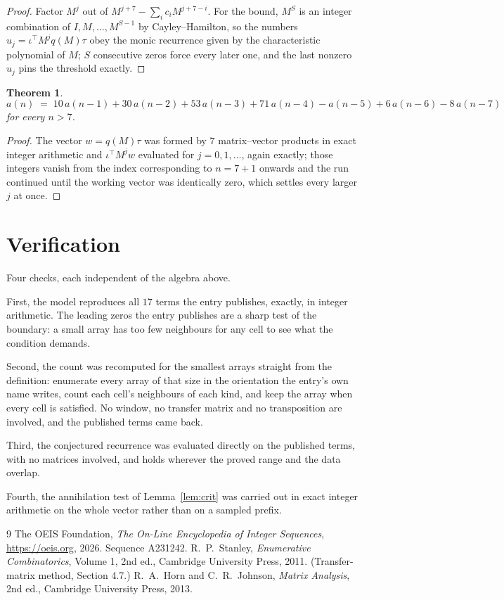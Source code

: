 \documentclass[11pt,a4paper]{article}
\theoremstyle{plain}
\newtheorem{theorem}{Theorem}
\theoremstyle{definition}
\begin{document}
\begin{proof}
Factor $M^{j}$ out of $M^{j+7}-\sum_ic_iM^{j+7-i}$. For the bound, $M^{S}$
is an integer combination of $I,M,\dots,M^{S-1}$ by Cayley--Hamilton, so the numbers
$u_j=\iota^{\!\top}M^{j}q(M)\tau$ obey the monic recurrence given by the characteristic
polynomial of $M$; $S$ consecutive zeros force every later one, and the last nonzero $u_j$
pins the threshold exactly.
\end{proof}

\begin{theorem}
\[
a(n)\;=\;10\,a(n-1) + 30\,a(n-2) + 53\,a(n-3) + 71\,a(n-4) - a(n-5) + 6\,a(n-6) - 8\,a(n-7)
\]
for every $n>7$.
\end{theorem}

\begin{proof}
The vector $w=q(M)\tau$ was formed by $7$ matrix--vector products in exact integer
arithmetic and $\iota^{\!\top}M^{j}w$ evaluated for $j=0,1,\dots$, again exactly; those
integers vanish from the index corresponding to $n=7+1$ onwards and the run continued
until the working vector was identically zero, which settles every larger $j$ at once.
\end{proof}

\section{Verification}

Four checks, each independent of the algebra above.

First, the model reproduces all $17$ terms the entry publishes, exactly, in integer
arithmetic. The leading zeros the entry publishes are a sharp test of the boundary: a small
array has too few neighbours for any cell to see what the condition demands.

Second, the count was recomputed for the smallest arrays straight from the definition:
enumerate every array of that size in the orientation the entry's own name writes, count each
cell's neighbours of each kind, and keep the array when every cell is satisfied. No window, no
transfer matrix and no transposition are involved, and the published terms came back.

Third, the conjectured recurrence was evaluated directly on the published terms, with no
matrices involved, and holds wherever the proved range and the data overlap.

Fourth, the annihilation test of Lemma~\ref{lem:crit} was carried out in exact integer
arithmetic on the whole vector rather than on a sampled prefix.

\begin{thebibliography}{9}
 The OEIS Foundation, \emph{The On-Line Encyclopedia of Integer
Sequences}, \url{https://oeis.org}, 2026. Sequence A231242.
 R.~P.~Stanley, \emph{Enumerative Combinatorics}, Volume 1, 2nd ed.,
Cambridge University Press, 2011. (Transfer-matrix method, Section 4.7.)
 R.~A.~Horn and C.~R.~Johnson, \emph{Matrix Analysis}, 2nd ed., Cambridge
University Press, 2013.
\end{thebibliography}
\end{document}
